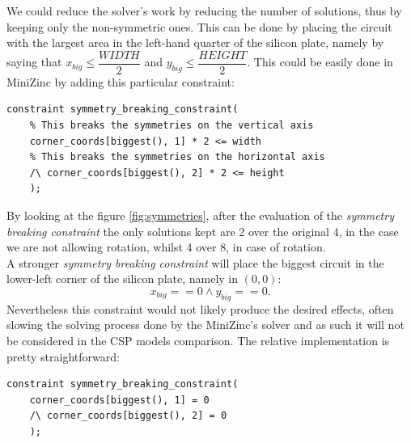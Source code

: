 We could reduce the solver's work by reducing the number of solutions, thus by keeping only the non-symmetric ones. This can be done by placing the circuit with the largest area in the left-hand quarter of the silicon plate, namely by saying that $x_{big} \leq \dfrac{WIDTH}{2}$ and $y_{big} \leq \dfrac{HEIGHT}{2}$. This could be easily done in MiniZinc by adding this particular constraint:
\begin{lstlisting}[language=Mzn]
constraint symmetry_breaking_constraint(
    % This breaks the symmetries on the vertical axis
    corner_coords[biggest(), 1] * 2 <= width
    % This breaks the symmetries on the horizontal axis
    /\ corner_coords[biggest(), 2] * 2 <= height
    );
\end{lstlisting}
By looking at the figure \ref{fig:symmetries}, after the evaluation of the \textit{symmetry breaking constraint} the only solutions kept are 2 over the original 4, in the case we are not allowing rotation, whilst 4 over 8, in case of rotation.\\
A stronger \textit{symmetry breaking constraint} will place the biggest circuit in the lower-left corner of the silicon plate, namely in $(0,0)$:
$$x_{big} == 0 \land y_{big} == 0.$$
Nevertheless this constraint would not likely produce the desired effects, often slowing the solving process done by the MiniZinc's solver and as such it will not be considered in the CSP models comparison. The relative implementation is pretty straightforward:
\begin{lstlisting}[language=Mzn]
constraint symmetry_breaking_constraint(
    corner_coords[biggest(), 1] = 0
    /\ corner_coords[biggest(), 2] = 0
    );
\end{lstlisting}
